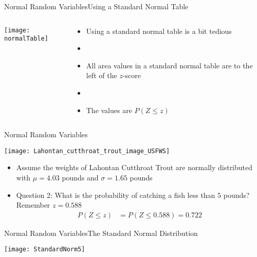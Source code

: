 \documentclass[xcolor=dvipsnames]{beamer}
\begin{document}
\begin{frame}{Normal Random Variables}{Using a Standard Normal Table}
	\begin{columns}
		\begin{column}{.6 \textwidth}
				\vspace{-15pt}
				\texttt{[image: normalTable]}
		\end{column}
		\begin{column}{.4 \textwidth}
			\begin{itemize}
				\item Using a standard normal table is a bit tedious
				\item[]
				\item All area values in a standard normal table are to the left of the $z$-score
				\item[]
				\item The values are $P(Z\leq z)$
			\end{itemize}
		\end{column}
	\end{columns}
\end{frame}


\begin{frame}{Normal Random Variables}
	\begin{center}
		\texttt{[image: Lahontan\_cutthroat\_trout\_image\_USFWS]}
	\end{center}
	\begin{itemize}
		\item Assume the weights of Lahontan Cutthroat Trout are normally distributed with $\mu = 4.03$ pounds and $\sigma = 1.65$ pounds \pause
		\item Question 2: What is the probability of catching a fish less than $5$ pounds? Remember $z = 0.588$ \pause
		\begin{align*}
		P(Z\leq z) &= P(Z \leq 0.588) = 0.722
		\end{align*}
	\end{itemize}
\end{frame}

\begin{frame}{Normal Random Variables}{The Standard Normal Distribution}
	\begin{center}
		\texttt{[image: StandardNorm5]}
	\end{center}
\end{frame}
\end{document}
